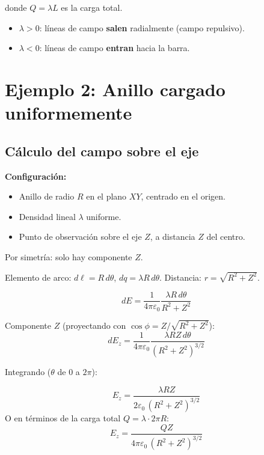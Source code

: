 \documentclass[12pt,a4paper]{article}
\begin{document}
donde $Q = \lambda L$ es la carga total.

\begin{itemize}[nosep]
  \item $\lambda > 0$: líneas de campo \textbf{salen} radialmente
        (campo repulsivo).
  \item $\lambda < 0$: líneas de campo \textbf{entran} hacia la barra.
\end{itemize}

\section{Ejemplo 2: Anillo cargado uniformemente}

\subsection{Cálculo del campo sobre el eje}

\textbf{Configuración:}
\begin{itemize}[nosep]
  \item Anillo de radio $R$ en el plano $XY$, centrado en el origen.
  \item Densidad lineal $\lambda$ uniforme.
  \item Punto de observación sobre el eje $Z$, a distancia $Z$ del
        centro.
\end{itemize}



Por simetría: solo hay componente $Z$.

Elemento de arco: $d\ell = R\,d\theta$, $dq = \lambda R\,d\theta$.
Distancia: $r = \sqrt{R^{2} + Z^{2}}$.

\[
dE = \frac{1}{4\pi\varepsilon_0}
      \frac{\lambda R\,d\theta}{R^{2} + Z^{2}}
\]

Componente $Z$ (proyectando con $\cos\phi = Z/\sqrt{R^{2} + Z^{2}}$):
\[
dE_z = \frac{1}{4\pi\varepsilon_0}
       \frac{\lambda R Z\,d\theta}{(R^{2} + Z^{2})^{3/2}}
\]

Integrando ($\theta$ de $0$ a $2\pi$):

\begin{keybox}
  \[
  \boxed{E_z = \frac{\lambda R Z}{2\varepsilon_0 \,
                (R^{2} + Z^{2})^{3/2}}}
  \]
  O en términos de la carga total $Q = \lambda \cdot 2\pi R$:
  \[
  \boxed{E_z = \frac{Q Z}{4\pi\varepsilon_0 \,
                (R^{2} + Z^{2})^{3/2}}}
  \]
\end{keybox}
\end{document}
